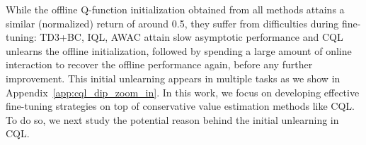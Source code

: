 
While the offline Q-function initialization obtained from all methods attains a similar (normalized) return of around 0.5, they suffer from difficulties during fine-tuning: TD3+BC, IQL, AWAC attain slow asymptotic performance and CQL unlearns the offline initialization, followed by spending a large amount of online interaction to recover the offline performance again, before any further improvement. This initial unlearning appears in multiple tasks as we show in Appendix~\ref{app:cql_dip_zoom_in}. In this work, we focus on developing effective fine-tuning strategies on top of conservative value estimation methods like CQL. To do so, we next study the potential reason behind the initial unlearning in CQL.  

